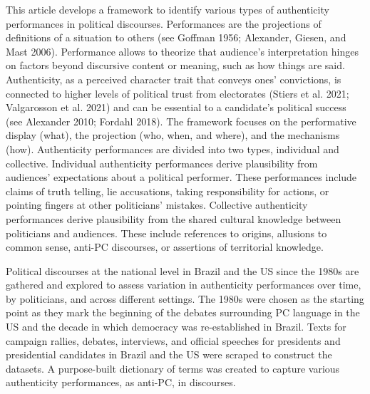 \documentclass[
  12pt,
]{article}
\begin{document}
This article develops a framework to identify various types of
authenticity performances in political discourses. Performances are the
projections of definitions of a situation to others (see Goffman 1956;
Alexander, Giesen, and Mast 2006). Performance allows to theorize that
audience's interpretation hinges on factors beyond discursive content or
meaning, such as how things are said. Authenticity, as a perceived
character trait that conveys ones' convictions, is connected to higher
levels of political trust from electorates (Stiers et al. 2021;
Valgarosson et al. 2021) and can be essential to a candidate's political
success (see Alexander 2010; Fordahl 2018). The framework focuses on the
performative display (what), the projection (who, when, and where), and
the mechanisms (how). Authenticity performances are divided into two
types, individual and collective. Individual authenticity performances
derive plausibility from audiences' expectations about a political
performer. These performances include claims of truth telling, lie
accusations, taking responsibility for actions, or pointing fingers at
other politicians' mistakes. Collective authenticity performances derive
plausibility from the shared cultural knowledge between politicians and
audiences. These include references to origins, allusions to common
sense, anti-PC discourses, or assertions of territorial knowledge.

Political discourses at the national level in Brazil and the US since
the 1980s are gathered and explored to assess variation in authenticity
performances over time, by politicians, and across different settings.
The 1980s were chosen as the starting point as they mark the beginning
of the debates surrounding PC language in the US and the decade in which
democracy was re-established in Brazil. Texts for campaign rallies,
debates, interviews, and official speeches for presidents and
presidential candidates in Brazil and the US were scraped to construct
the datasets. A purpose-built dictionary of terms was created to capture
various authenticity performances, as anti-PC, in discourses.
\end{document}
